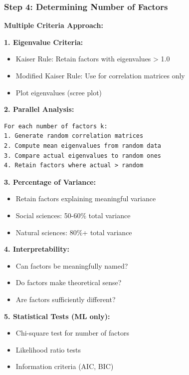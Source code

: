 \documentclass[
]{article}
\begin{document}
\subsubsection{Step 4: Determining Number of Factors}

\textbf{Multiple Criteria Approach:}

\textbf{1. Eigenvalue Criteria:}

\begin{itemize}
\item
  Kaiser Rule: Retain factors with eigenvalues \textgreater{} 1.0
\item
  Modified Kaiser Rule: Use for correlation matrices only
\item
  Plot eigenvalues (scree plot)
\end{itemize}

\textbf{2. Parallel Analysis:}

\begin{verbatim}
For each number of factors k:
1. Generate random correlation matrices
2. Compute mean eigenvalues from random data
3. Compare actual eigenvalues to random ones
4. Retain factors where actual > random
\end{verbatim}

\textbf{3. Percentage of Variance:}

\begin{itemize}
\item
  Retain factors explaining meaningful variance
\item
  Social sciences: 50-60\% total variance
\item
  Natural sciences: 80\%+ total variance
\end{itemize}

\textbf{4. Interpretability:}

\begin{itemize}
\item
  Can factors be meaningfully named?
\item
  Do factors make theoretical sense?
\item
  Are factors sufficiently different?
\end{itemize}

\textbf{5. Statistical Tests (ML only):}

\begin{itemize}
\item
  Chi-square test for number of factors
\item
  Likelihood ratio tests
\item
  Information criteria (AIC, BIC)
\end{itemize}
\end{document}
